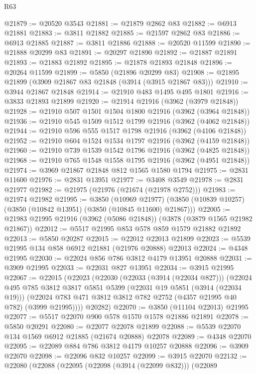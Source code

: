 \begin{lexlean}{R63}
\begin{coremodule}
@21879 := @20520 @3543
@21881 := @21879 @2862 @83
@21882 := @6913 @21881
@21883 := @3811 @21882
@21885 := @21597 @2862 @83
@21886 := @6913 @21885
@21887 := @3811 @21886
@21888 := @20520 @11599
@21890 := @21888 @20299 @83
@21891 := @20297 @21890
@21892 := @21887 @21891
@21893 := @21883 @21892
@21895 := @21878 @21893 @21848
@21896 := @20264 @11599
@21899 := @5850 (@21896 @20299 @83)
@21908 := @21895 @21899 (@3909 @21867 @83 @21848 (@3914 (@3915 @21867 @83)))
@21910 := @3944 @21867 @21848
@21914 := @21910 @483 @1495 @495 @1801
@21916 := @3833 @21893 @21899
@21920 := @21914 @21916 (@3962 (@3979 @21848))
@21928 := @21910 @507 @1501 @1504 @1800 @21916 (@3962 (@3964 @21848))
@21936 := @21910 @545 @1509 @1512 @1799 @21916 (@3962 (@4062 @21848))
@21944 := @21910 @596 @555 @1517 @1798 @21916 (@3962 (@4106 @21848))
@21952 := @21910 @604 @1524 @1534 @1797 @21916 (@3962 (@4159 @21848))
@21960 := @21910 @739 @1539 @1542 @1796 @21916 (@3962 (@4825 @21848))
@21968 := @21910 @765 @1548 @1558 @1795 @21916 (@3962 (@4951 @21848))
@21974 := @3969 @21867 @21848 @812 @1565 @1580 @1794
@21975 := @2831 @11600
@21976 := @2831 @13951
@21977 := @3408 @3549
@21978 := @2831 @21977
@21982 := @21975 (@21976 (@21674 (@21978 @2752)))
@21983 := @21974 @21982
@21995 := @3850
    (@10969 @21977)
    (@3850 (@10839 @10257) (@3850 (@10842 @13951) (@3850 (@10845 @11600) @21867)))
@22005 := @21983 @21995 @21916 (@3962 (@5086 @21848)) (@3878 (@3879 @1565 @21982 @21867))
@22012 := @5517 @21995 @853 @578 @859 @1579 @21882 @21892
@22013 := @5850 @20287
@22015 := @22012 @22013 @21899
@22023 := @5539 @21995 @134 @858 @6912 @21881 (@21976 @20888) @22013
@22024 := @4348 @21995
@22030 := @22024 @856 @786 @3812 @4179 @13951 @20888
@22031 := @3909 @21995
@22033 := @22031 @827 @13951
@22034 := @3915 @21995
@22067 := @22015
    (@22023
      (@22030
        (@22033 (@3914 (@22034 @827)))
        (@22024
          @495
          @785
          @3812
          @3817
          @5851
          @5399
          (@22031 @19 @5851 (@3914 (@22034 @19)))
          (@22024 @783 @471 @3812 @3812 @782 @2752 (@4357 @21995 @40 @782) (@3999 @21995))))
      @20282)
@22070 := @3850 (@11104 @22013) @21995
@22077 := @5517 @22070 @900 @578 @1570 @1578 @21886 @21891
@22078 := @5850 @20291
@22080 := @22077 @22078 @21899
@22088 := @5539 @22070 @134 @1569 @6912 @21885 (@21674 @20888) @22078
@22089 := @4348 @22070
@22095 := @22089 @884 @786 @3812 @4179 @10257 @20888
@22096 := @3909 @22070
@22098 := @22096 @832 @10257
@22099 := @3915 @22070
@22132 := @22080
    (@22088
      (@22095
        (@22098 (@3914 (@22099 @832)))
        (@22089

\end{coremodule}
\end{lexlean}
